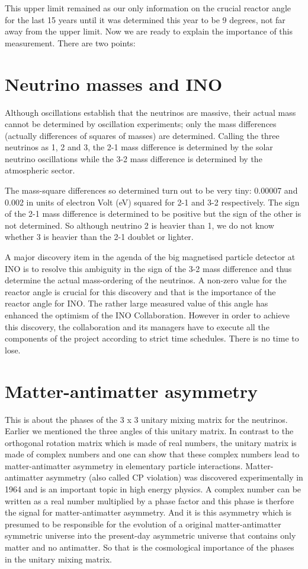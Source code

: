 This upper limit remained as our only information on the crucial
reactor angle for the last 15 years until it was determined
this year to be 9 degrees, not far away from the upper limit.
Now we are ready to explain the importance of this measurement. 
There are two points:

\section{Neutrino masses and INO}

Although oscillations establish that the neutrinos are massive, 
their actual mass cannot be determined by oscillation experiments; 
only the mass differences (actually differences of squares of 
masses) are determined. Calling the three neutrinos as 1, 2 and 3, 
the 2-1 mass difference is determined by the solar neutrino
oscillations while the 3-2 mass difference is determined by the 
atmospheric sector. 

The mass-square differences so determined turn out to be very tiny:
0.00007 and 0.002 in units of electron Volt (eV) squared for 2-1 and 
3-2 respectively. The sign of the 2-1 mass difference is determined
to be positive but the sign of the other is not determined. 
So although neutrino 2 is heavier than 1, we do not know whether 
3 is heavier than the 2-1 doublet or lighter.

A major discovery item in the agenda of the big magnetised 
particle detector at INO is to resolve this ambiguity in the  
sign of the 3-2 mass difference and thus determine
the actual mass-ordering of the neutrinos. A non-zero value for
the reactor angle is crucial for this discovery and that is the
importance of the reactor angle for INO. The rather large 
measured value of this angle has enhanced the optimism of
the INO Collaboration. However in order to achieve this discovery, 
the collaboration and its managers have to execute all the
components of the project according to strict time schedules. 
There is no time to lose.

\section{Matter-antimatter asymmetry}

This is about the phases of the 3 x 3 unitary mixing matrix for
the neutrinos. Earlier we mentioned the three angles of
this unitary matrix. In contrast to the orthogonal rotation
matrix which is made of real numbers, the unitary matrix is
made of complex numbers and one can show that these complex
numbers lead to matter-antimatter asymmetry in elementary
particle interactions. Matter-antimatter asymmetry (also
called CP violation) was discovered experimentally in 1964
and is an important topic in high energy physics. 
A complex number can be written as a real number multiplied 
by a phase factor and this phase is therfore the signal for 
matter-antimatter asymmetry. And it is this asymmetry which is 
presumed to be responsible for the evolution of a original 
matter-antimatter symmetric universe into the present-day  
asymmetric universe that contains only matter and no
antimatter. So that is the cosmological importance of the 
phases in the unitary mixing matrix.

